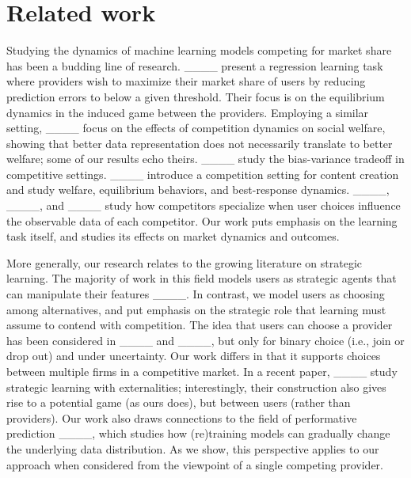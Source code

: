 \section{Related work}
Studying the dynamics of machine learning models competing for market share  has been a budding line of research. ____ 
present a regression learning task where providers wish to maximize their market share of users by reducing prediction errors to below a given threshold.
Their focus is on the equilibrium dynamics in the induced game between the providers.
Employing a similar setting, ____ focus on the effects of competition dynamics on social welfare, showing that better data representation does not necessarily translate to better welfare;
some of our results echo theirs.
____ study the bias-variance tradeoff in competitive settings.
____ introduce a competition setting for content creation and study welfare,  equilibrium behaviors,
and best-response dynamics. ____, ____, and ____ study how competitors specialize when user choices influence the observable data of each competitor. 
Our work puts emphasis on the learning task itself,
and studies its effects on market dynamics and outcomes.

\squeeze

More generally, our research relates to the growing literature on strategic learning.
The majority of work in this field models users as strategic agents that can manipulate their features ____.
In contrast, we model users as choosing among alternatives,
and put emphasis on the strategic role that learning must assume to contend with competition.
The idea that users can choose a provider has been considered in 
____ and ____,
but only for binary choice (i.e., join or drop out) and under uncertainty.
Our work differs in that it supports choices between multiple firms in a competitive market.
In a recent paper, ____ study strategic learning with externalities; interestingly, their construction also gives rise to a potential game (as ours does), but between users (rather than providers).
Our work also draws connections to the field of performative prediction ____, which studies how (re)training models can gradually change the underlying data distribution.
As we show, this perspective applies to our approach when considered
from the viewpoint of a single competing provider.
\squeeze


